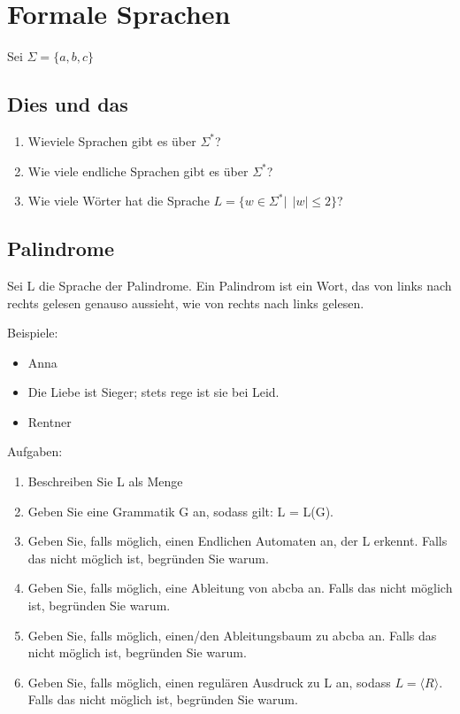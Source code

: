 \documentclass[a4paper,12pt]{article}
\begin{document}
\pagebreak

\section{Formale Sprachen}
Sei $\Sigma = \{a, b, c\}$

\subsection{Dies und das}
\begin{enumerate}
  \item Wieviele Sprachen gibt es über $\Sigma^*$?
  \item Wie viele endliche Sprachen gibt es über $\Sigma^*$?
  \item Wie viele Wörter hat die Sprache $L = \{w \in \Sigma^* |~~|w| \leq 2\}$?
\end{enumerate}

\subsection{Palindrome}
Sei L die Sprache der Palindrome. Ein Palindrom ist ein Wort, das von links nach 
rechts gelesen genauso aussieht, wie von rechts nach links gelesen.

Beispiele:
\begin{itemize}
  \item Anna
  \item Die Liebe ist Sieger; stets rege ist sie bei Leid.
  \item Rentner
\end{itemize}

Aufgaben:
\begin{enumerate}
  \item Beschreiben Sie L als Menge
  \item Geben Sie eine Grammatik G an, sodass gilt: L = L(G).
  \item Geben Sie, falls möglich, einen Endlichen Automaten an, der L erkennt. Falls das nicht möglich ist, begründen Sie warum.
  \item Geben Sie, falls möglich, eine Ableitung von \glqq abcba\grqq{} an. Falls das nicht möglich ist, begründen Sie warum.
  \item Geben Sie, falls möglich, einen/den Ableitungsbaum zu \glqq abcba\grqq{} an. Falls das nicht möglich ist, begründen Sie warum.
  \item Geben Sie, falls möglich, einen regulären Ausdruck zu L an, sodass $L = \langle R \rangle $. Falls das nicht möglich ist, begründen Sie warum.
\end{enumerate}
\end{document}
